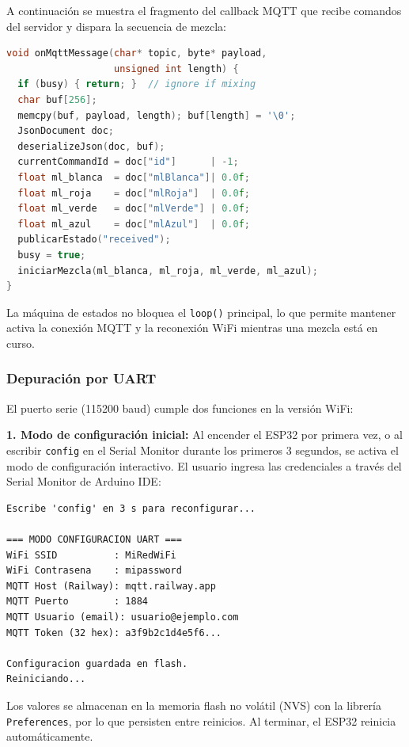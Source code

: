 \documentclass[conference]{IEEEtran}
\begin{document}
A continuaci\'on se muestra el fragmento del callback MQTT que recibe comandos del servidor y dispara la secuencia de mezcla:

\begin{lstlisting}[language=C++, caption={Callback MQTT del ESP32 --- recepci\'on de comandos}]
void onMqttMessage(char* topic, byte* payload,
                   unsigned int length) {
  if (busy) { return; }  // ignore if mixing
  char buf[256];
  memcpy(buf, payload, length); buf[length] = '\0';
  JsonDocument doc;
  deserializeJson(doc, buf);
  currentCommandId = doc["id"]      | -1;
  float ml_blanca  = doc["mlBlanca"]| 0.0f;
  float ml_roja    = doc["mlRoja"]  | 0.0f;
  float ml_verde   = doc["mlVerde"] | 0.0f;
  float ml_azul    = doc["mlAzul"]  | 0.0f;
  publicarEstado("received");
  busy = true;
  iniciarMezcla(ml_blanca, ml_roja, ml_verde, ml_azul);
}
\end{lstlisting}

La m\'aquina de estados no bloquea el \texttt{loop()} principal, lo que permite mantener activa la conexi\'on MQTT y la reconexi\'on WiFi mientras una mezcla est\'a en curso.

\subsubsection{Depuraci\'on por UART}

El puerto serie (115200 baud) cumple dos funciones en la versi\'on WiFi:

\textbf{1. Modo de configuraci\'on inicial:} Al encender el ESP32 por primera vez, o al escribir \texttt{config} en el Serial Monitor durante los primeros 3 segundos, se activa el modo de configuraci\'on interactivo. El usuario ingresa las credenciales a trav\'es del Serial Monitor de Arduino IDE:

\begin{lstlisting}[caption={Sesi\'on de configuraci\'on UART --- primer arranque}]
Escribe 'config' en 3 s para reconfigurar...

=== MODO CONFIGURACION UART ===
WiFi SSID          : MiRedWiFi
WiFi Contrasena    : mipassword
MQTT Host (Railway): mqtt.railway.app
MQTT Puerto        : 1884
MQTT Usuario (email): usuario@ejemplo.com
MQTT Token (32 hex): a3f9b2c1d4e5f6...

Configuracion guardada en flash.
Reiniciando...
\end{lstlisting}

Los valores se almacenan en la memoria flash no vol\'atil (NVS) con la librer\'ia \texttt{Preferences}, por lo que persisten entre reinicios. Al terminar, el ESP32 reinicia autom\'aticamente.
\end{document}
